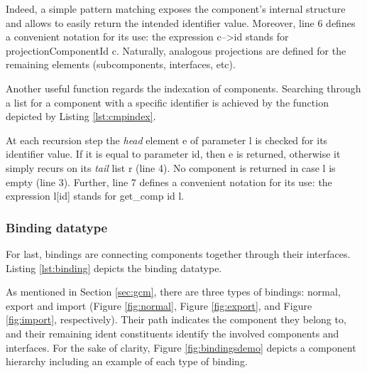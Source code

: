 	\noindent Indeed, a simple pattern matching exposes the \textsf{component}'s 
	internal structure and allows to easily
	return the intended \textsf{identifier} value. Moreover, line 6 defines a convenient notation
	for its use: the expression \textsf{c-->id} stands for \textsf{projectionComponentId c}. Naturally,
	analogous projections are defined for the remaining elements (subcomponents, interfaces, etc).
	
		Another useful function regards the indexation of \textsf{component}s. Searching through
	a list for a \textsf{component} with a specific \textsf{identifier} is achieved by the function
	depicted by Listing \ref{lst:cmpindex}.

		

	\noindent At each recursion step the \textit{head} element \textsf{e} of 
	parameter \textsf{l} is checked for its \textsf{identifier} value. If it is equal to 
	parameter \textsf{id}, then \textsf{e} is returned, otherwise it simply recurs 
	on its \textit{tail} list \textsf{r} (line 4). No \textsf{component} is returned
	in case \textsf{l} is empty (line 3). Further, line 7 defines a convenient notation for its use:
	the expression \textsf{l[id]} stands for \textsf{get\_comp id l}.
	

\subsubsection{Binding datatype}
		 
			For last, \textsf{binding}s are connecting \textsf{component}s together through their \textsf{interface}s.
		Listing \ref{lst:binding} depicts the \textsf{binding} datatype.

			
		
		\noindent As mentioned in Section \ref{sec:gcm}, there are three types of bindings: 
		normal, export and import (Figure \ref{fig:normal}, Figure \ref{fig:export}, and Figure \ref{fig:import},
		respectively). Their \textsf{path} indicates the \textsf{component} they belong to, 
		and their remaining \textsf{ident} constituents identify the involved \textsf{component}s and
		\textsf{interface}s. For the sake of clarity, Figure \ref{fig:bindingsdemo} depicts a component
		hierarchy including an example of each type of binding.
		

